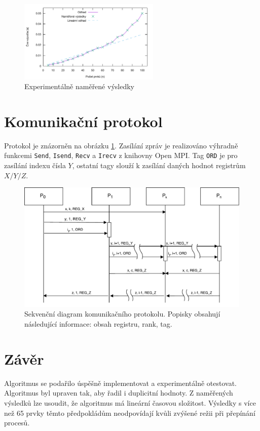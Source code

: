\documentclass[11pt,a4paper]{article}
\begin{document}
\begin{figure}[!ht]
    \centering
		\includegraphics[width=0.6\textwidth]{results}
    \caption{Experimentálně naměřené výsledky}
\end{figure}

\section{Komunikační protokol}
\label{proto}

Protokol je znázorněn na obrázku \ref{proto_schema}. Zasílání zpráv je realizováno výhradně funkcemi \texttt{Send}, \texttt{Isend}, \texttt{Recv} a \texttt{Irecv} z knihovny Open MPI. Tag \texttt{ORD} je pro zasílání indexu čísla $Y$, ostatní tagy slouží k zasílání daných hodnot registrům $X/Y/Z$.

\begin{figure}[!h]
    \includegraphics[width=0.8\linewidth]{protokol}
    \centering
    \caption{Sekvenční diagram komunikačního protokolu. Popisky obsahují následující informace: obsah registru, rank, tag.}
    \label{proto_schema}
\end{figure}


\section{Závěr}

Algoritmus se podařilo úspěšně implementovat a experimentálně otestovat. Algoritmus byl upraven tak, aby řadil i duplicitní hodnoty. Z naměřených výsledků lze usoudit, že algoritmus má lineární časovou složitost. Výsledky s více než 65 prvky těmto předpokládům neodpovídají kvůli zvýšené režii při přepínání procesů.




\makeatletter
\makeatother

\end{document}
